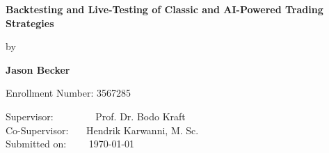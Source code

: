 \begin{titlepage}
    \vspace{2cm}

    \begin{minipage}{0.9\textwidth}
        \fontsize{20pt}{16pt}\selectfont
        \begin{center}
            \textbf{Backtesting and Live-Testing of Classic and AI-Powered Trading Strategies}
        \end{center}
    \end{minipage}


    \vspace{2cm}

    \begin{minipage}{0.9\textwidth}
        \fontsize{14pt}{16pt}\selectfont
        \begin{center}
            by
        \end{center}
    \end{minipage}

    \vspace{0.2cm}

    \begin{minipage}{0.9\textwidth}
        \fontsize{14pt}{16pt}\selectfont
        \begin{center}
            \textbf{Jason Becker}
        \end{center}
    \end{minipage}

    \vspace{0.2cm}

    \begin{minipage}{0.9\textwidth}
        \fontsize{14pt}{16pt}\selectfont
        \begin{center}
            Enrollment Number: 3567285
        \end{center}
    \end{minipage}

    \vspace{5cm}

    \begin{minipage}{0.9\textwidth}
        \fontsize{12pt}{16pt}\selectfont
        Supervisor: \ \ \ \ \ \ \ \ Prof. Dr. Bodo Kraft \\
        Co-Supervisor: \ \ \ Hendrik Karwanni, M. Sc. \\
        Submitted on: \ \ \ \ \today
    \end{minipage}

\end{titlepage}